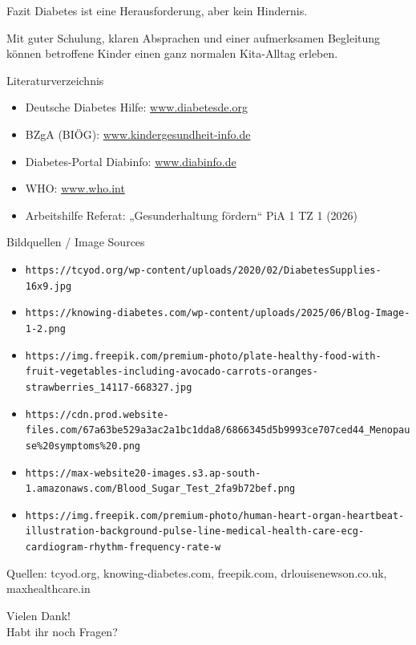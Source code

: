 \documentclass[10pt, aspectratio=169]{beamer}
\begin{document}
	\begin{frame}{Fazit}
		\centering
		\Large
		Diabetes ist eine Herausforderung, aber kein Hindernis.
		
		\vspace{1em}
		\normalsize
		Mit guter Schulung, klaren Absprachen und einer aufmerksamen Begleitung können betroffene Kinder einen ganz normalen Kita-Alltag erleben.
	\end{frame}
	
	\begin{frame}{Literaturverzeichnis}
		\begin{itemize}
			\item Deutsche Diabetes Hilfe: \url{www.diabetesde.org}
			\item BZgA (BIÖG): \url{www.kindergesundheit-info.de}
			\item Diabetes-Portal Diabinfo: \url{www.diabinfo.de}
			\item WHO: \url{www.who.int}
			\item Arbeitshilfe Referat: „Gesunderhaltung fördern“ PiA 1 TZ 1 (2026)
		\end{itemize}
	\end{frame}
	
	\begin{frame}{Bildquellen / Image Sources}
		\footnotesize
		\begin{itemize}
			\item \texttt{https://tcyod.org/wp-content/uploads/2020/02/DiabetesSupplies-16x9.jpg}
			\item \texttt{https://knowing-diabetes.com/wp-content/uploads/2025/06/Blog-Image-1-2.png}
			\item \texttt{https://img.freepik.com/premium-photo/plate-healthy-food-with-fruit-vegetables-including-avocado-carrots-oranges-strawberries\_14117-668327.jpg}
			\item \texttt{https://cdn.prod.website-files.com/67a63be529a3ac2a1bc1dda8/6866345d5b9993ce707ced44\_Menopause\%20symptoms\%20.png}
			\item \texttt{https://max-website20-images.s3.ap-south-1.amazonaws.com/Blood\_Sugar\_Test\_2fa9b72bef.png}
			\item \texttt{https://img.freepik.com/premium-photo/human-heart-organ-heartbeat-illustration-background-pulse-line-medical-health-care-ecg-cardiogram-rhythm-frequency-rate-w}
		\end{itemize}
		\vspace{0.5em}
		\scriptsize Quellen: tcyod.org, knowing-diabetes.com, freepik.com, drlouisenewson.co.uk, maxhealthcare.in
	\end{frame}
	
	\begin{frame}
		\centering
		\Huge Vielen Dank! \\
		\vspace{1em}
		\normalsize Habt ihr noch Fragen?
	\end{frame}
	
\end{document}
